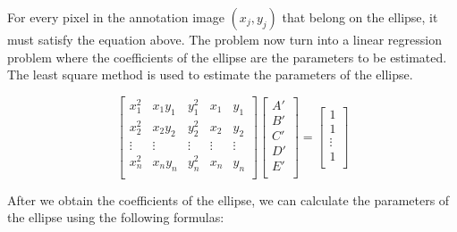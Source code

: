 \documentclass[14pt]{extreport}
\begin{document}
For every pixel in the annotation image $(x_j, y_j)$ that belong on the ellipse, it must satisfy the equation above. The problem now turn into a linear regression problem where the coefficients of the ellipse are the parameters to be estimated. The least square method is used to estimate the parameters of the ellipse.

$$ \begin{bmatrix}
        x_1^2  & x_1y_1 & y_1^2  & x_1    & y_1    \\
        x_2^2  & x_2y_2 & y_2^2  & x_2    & y_2    \\
        \vdots & \vdots & \vdots & \vdots & \vdots \\
        x_n^2  & x_ny_n & y_n^2  & x_n    & y_n    \\
    \end{bmatrix}
    \begin{bmatrix}
        A' \\
        B' \\
        C' \\
        D' \\
        E' \\
    \end{bmatrix}
    =
    \begin{bmatrix}
        1      \\
        1      \\
        \vdots \\
        1      \\
    \end{bmatrix} $$

After we obtain the coefficients of the ellipse, we can calculate the parameters of the ellipse using the following formulas:
\end{document}
